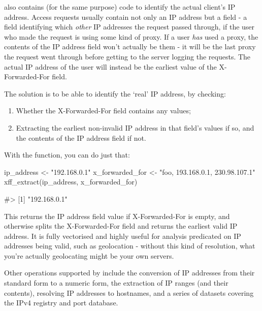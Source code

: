  also contains (for the same purpose) code to identify the
actual client's IP address. Access requests usually contain not only an
IP address but a  field - a field identifying which
\emph{other} IP addresses the request passed through, if the user who
made the request is using some kind of proxy. If a user \emph{has} used
a proxy, the contents of the IP address field won't actually be them -
it will be the last proxy the request went through before getting to the
server logging the requests. The actual IP address of the user will
instead be the earliest value of the X-Forwarded-For field.

The solution is to be able to identify the `real' IP address, by
checking:

\begin{enumerate}
\def\labelenumi{\arabic{enumi}.}
\itemsep1pt\parskip0pt
\item
  Whether the X-Forwarded-For field contains any values;
\item
  Extracting the earliest non-invalid IP address in that field's values
  if so, and the contents of the IP address field if not.
\end{enumerate}

With the  function, you can do just that:

\begin{Schunk}
\begin{Sinput}
ip_address <- "192.168.0.1"
x_forwarded_for <- "foo, 193.168.0.1, 230.98.107.1"
xff_extract(ip_address, x_forwarded_for)
\end{Sinput}
\begin{Soutput}
#> [1] "192.168.0.1"
\end{Soutput}
\end{Schunk}

This returns the IP address field value if X-Forwarded-For is empty, and
otherwise splits the X-Forwarded-For field and returns the earliest
valid IP address. It is fully vectorised and highly useful for analysis
predicated on IP addresses being valid, such as geolocation - without
this kind of resolution, what you're actually geolocating might be your
own servers.

Other operations supported by  include the conversion of IP
addresses from their standard  form to a numeric
form, the extraction of IP ranges (and their contents), resolving IP
addresses to hostnames, and a series of datasets covering the IPv4
registry and port database.

